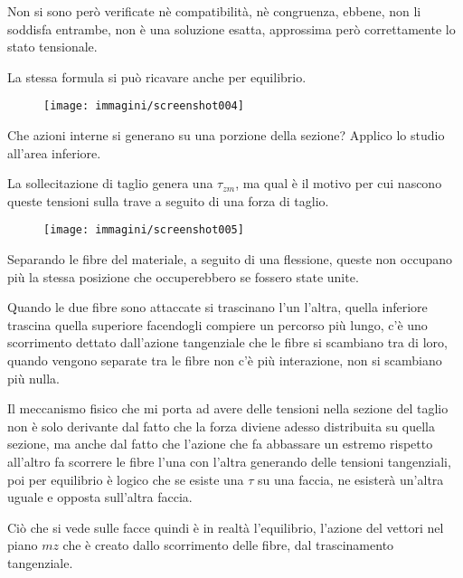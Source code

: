 \documentclass{article}
\begin{document}
\begin{adjustwidth}{2in}{}
		 Non si sono però verificate nè compatibilità, nè congruenza, ebbene, non li soddisfa entrambe, non è una soluzione esatta, approssima però correttamente lo stato tensionale. \newline 
		 
		 La stessa formula si può ricavare anche per equilibrio. 
		 
\begin{figure}[H]
	\centering
	\texttt{[image: immagini/screenshot004]}
	\label{fig:screenshot004.2}
\end{figure}

		Che azioni interne si generano su una porzione della sezione? Applico lo studio all'area inferiore.

		La sollecitazione di taglio genera una $\tau_{zm}$, ma qual è il motivo per cui nascono queste tensioni sulla trave a seguito di una forza di taglio.
		
\begin{figure}[H]
	\centering
	\label{fig:screenshot005}
	\texttt{[image: immagini/screenshot005]}
\end{figure}


		Separando le fibre del materiale, a seguito di una flessione, queste non occupano più la stessa posizione che occuperebbero se fossero state unite.
		

		Quando le due fibre sono attaccate si trascinano l'un l'altra, quella inferiore trascina quella superiore facendogli compiere un percorso più lungo, c'è uno scorrimento dettato dall'azione tangenziale che le fibre si scambiano tra di loro, quando vengono separate tra le fibre non c'è più interazione, non si scambiano più nulla. \newline
		
		Il meccanismo fisico che mi porta ad avere delle tensioni nella sezione del taglio non è solo derivante dal fatto che la forza diviene adesso distribuita su quella sezione, ma anche dal fatto che l'azione che fa abbassare un estremo rispetto all'altro fa scorrere le fibre l'una con l'altra generando delle tensioni tangenziali, poi per equilibrio è logico che se esiste una $\tau$ su una faccia, ne esisterà un'altra uguale e opposta sull'altra faccia. 
		
		Ciò che si vede sulle facce quindi è in realtà l'equilibrio, l'azione del vettori nel piano $mz$ che è creato dallo scorrimento delle fibre, dal trascinamento tangenziale.  \newline 
		

\end{adjustwidth}
\end{document}
